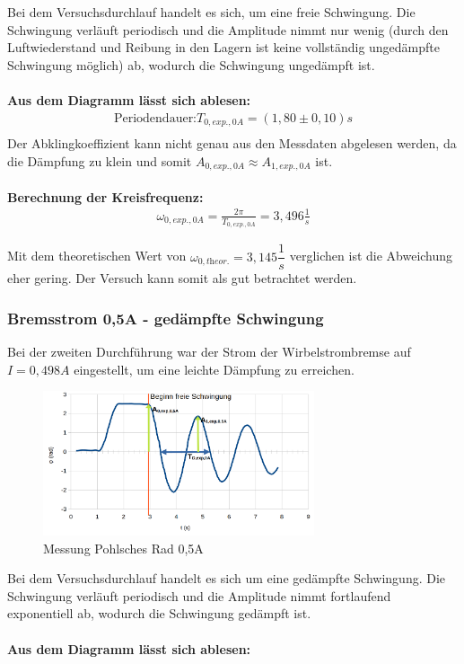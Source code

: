 \documentclass[a4paper]{scrartcl}
\numberwithin{equation}{subsection}
\begin{document}
Bei dem Versuchsdurchlauf handelt es sich, um eine freie Schwingung. Die Schwingung verläuft periodisch und die Amplitude nimmt nur wenig (durch den Luftwiederstand und Reibung in den Lagern ist keine vollständig ungedämpfte Schwingung möglich) ab, wodurch die Schwingung ungedämpft ist.
\\ \\
\textbf{Aus dem Diagramm lässt sich ablesen:}
\begin{align*}
\text{Periodendauer:} T_{0,\textit{exp.},0A} = (1,80\pm0,10)s \\
\end{align*}
Der Abklingkoeffizient kann nicht genau aus den Messdaten abgelesen werden, da die Dämpfung zu klein und somit $A_{0,\textit{exp.},0A} \approx A_{1,\textit{exp.},0A}$ ist.
\\ \\
\textbf{Berechnung der Kreisfrequenz:}
\begin{align}
\omega_{0,\textit{exp.},0A} = \frac{2\pi}{T_{0,\textit{exp.},0A}} = 3,496 \frac{1}{s}
\end{align}

Mit dem theoretischen Wert von $\omega_{0,\textit{theor.}} = 3,145 \dfrac{1}{s}$ verglichen ist die Abweichung eher gering. Der Versuch kann somit als gut betrachtet werden.


\subsubsection{Bremsstrom 0,5A - gedämpfte Schwingung}
Bei der zweiten Durchführung war der Strom der Wirbelstrombremse auf $I = 0,498A$ eingestellt, um eine leichte Dämpfung zu erreichen.

\begin{figure}[H]
\includegraphics[width=8cm]{Messung_Rad_graph_05A}
\centering
\caption{Messung Pohlsches Rad 0,5A}
\centering
\end{figure}

Bei dem Versuchsdurchlauf handelt es sich um eine gedämpfte Schwingung. Die Schwingung verläuft periodisch und die Amplitude nimmt fortlaufend exponentiell ab, wodurch die Schwingung gedämpft ist.
\\ \\
\textbf{Aus dem Diagramm lässt sich ablesen:}
\end{document}
